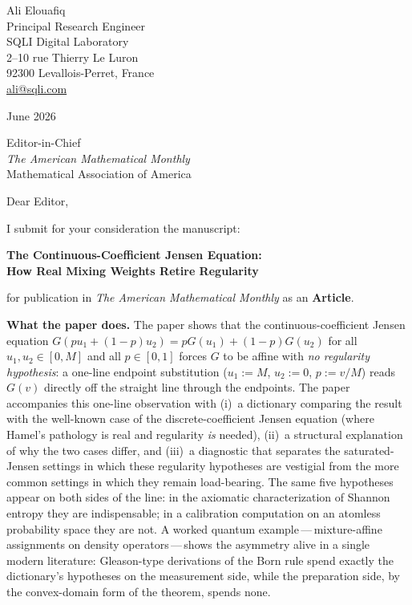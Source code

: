 \documentclass[12pt]{article}
\begin{document}
\noindent
Ali Elouafiq\\
Principal Research Engineer\\
SQLI Digital Laboratory\\
2--10 rue Thierry Le Luron\\
92300 Levallois-Perret, France\\
\href{mailto:ali@sqli.com}{ali@sqli.com}

\bigskip
{} June 2026

\bigskip
\noindent
Editor-in-Chief\\
\textit{The American Mathematical Monthly}\\
Mathematical Association of America

\bigskip
\noindent
Dear Editor,

\medskip
\noindent
I submit for your consideration the manuscript:

\begin{center}
  \textbf{The Continuous-Coefficient Jensen Equation:}\\
  \textbf{How Real Mixing Weights Retire Regularity}
\end{center}

\noindent
for publication in \textit{The American Mathematical Monthly} as an
\textbf{Article}.

\bigskip
\noindent\textbf{What the paper does.}
The paper shows that the continuous-coefficient Jensen equation
$G(pu_1+(1-p)u_2)=pG(u_1)+(1-p)G(u_2)$ for all $u_1,u_2\in[0,M]$ and
all $p\in[0,1]$ forces $G$ to be affine with \emph{no regularity
hypothesis}: a one-line endpoint substitution ($u_1{:=}M$, $u_2{:=}0$,
$p{:=}v/M$) reads $G(v)$ directly off the straight line through the
endpoints. The paper accompanies this one-line observation with
(i)~a dictionary comparing the result with the well-known case of the
discrete-coefficient Jensen equation (where Hamel's pathology is real
and regularity \emph{is} needed), (ii)~a structural explanation of
why the two cases differ, and (iii)~a diagnostic that separates the
saturated-Jensen settings in which these regularity hypotheses are
vestigial from the more common settings in which they remain
load-bearing. The same five hypotheses appear on both sides of the
line: in the axiomatic characterization of Shannon entropy they are
indispensable; in a calibration computation on an atomless
probability space they are not. A worked quantum
example\,---\,mixture-affine assignments on density
operators\,---\,shows the asymmetry alive in a single modern
literature: Gleason-type derivations of the Born rule spend exactly
the dictionary's hypotheses on the measurement side, while the
preparation side, by the convex-domain form of the theorem, spends
none.
\end{document}
